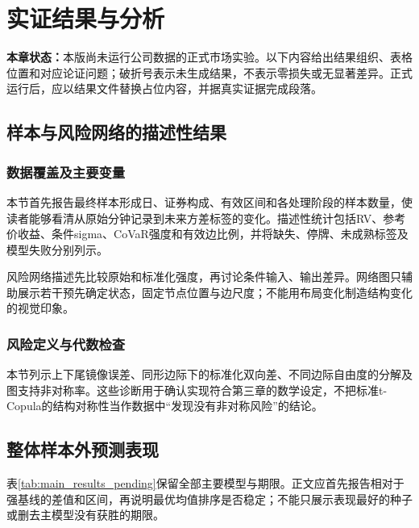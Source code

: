 \chapter{实证结果与分析}
\noindent\textbf{本章状态：}本版尚未运行公司数据的正式市场实验。以下内容给出结果组织、表格位置和对应论证问题；破折号表示未生成结果，不表示零损失或无显著差异。正式运行后，应以结果文件替换占位内容，并据真实证据完成段落。

\section{样本与风险网络的描述性结果}
\subsection{数据覆盖及主要变量}
本节首先报告最终样本形成日、证券构成、有效区间和各处理阶段的样本数量，使读者能够看清从原始分钟记录到未来方差标签的变化。描述性统计包括RV、参考价收益、条件sigma、CoVaR强度和有效边比例，并将缺失、停牌、未成熟标签及模型失败分别列示。


风险网络描述先比较原始和标准化强度，再讨论条件输入、输出差异。网络图只辅助展示若干预先确定状态，固定节点位置与边尺度；不能用布局变化制造结构变化的视觉印象。

\subsection{风险定义与代数检查}
本节列示上下尾镜像误差、同形边际下的标准化双向差、不同边际自由度的分解及图支持非对称率。这些诊断用于确认实现符合第三章的数学设定，不把标准t-Copula的结构对称性当作数据中“发现没有非对称风险”的结论。


\section{整体样本外预测表现}
表\ref{tab:main_results_pending}保留全部主要模型与期限。正文应首先报告相对于强基线的差值和区间，再说明最优均值排序是否稳定；不能只展示表现最好的种子或删去主模型没有获胜的期限。

